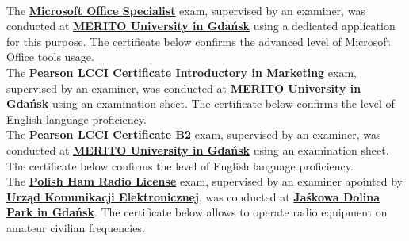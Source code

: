 \begin{rightcolumn}
        \vspace{\itemspace}\\
            {The \href{https://support.microsoft.com/en-us/topic/earn-a-microsoft-office-specialist-mos-certification-0885c944-167c-51ea-1cdc-8f65952bd1b8}{\textbf{Microsoft Office Specialist}} exam, supervised by an examiner, was conducted at \href{https://www.merito.pl/english/gdansk/}{\textbf{MERITO University in Gdańsk}} using a dedicated application for this purpose. The certificate below confirms the advanced level of Microsoft Office tools usage.}
        \vspace{\itemspace}\\
            {The \href{https://drive.google.com/file/d/1vBCEezspA7uQ0AJuSDX23JJqBxelfT__/view}{\textbf{Pearson LCCI Certificate Introductory in Marketing}} exam, supervised by an examiner, was conducted at \href{https://www.merito.pl/english/gdansk/}{\textbf{MERITO University in Gdańsk}} using an examination sheet. The certificate below confirms the level of English language proficiency.}
        \vspace{\itemspace}\\
            {The \href{https://drive.google.com/file/d/13rLS1UrRYQnpc4gBlC56gpBl9o_awkVq/view}{\textbf{Pearson LCCI Certificate B2}} exam, supervised by an examiner, was conducted at \href{https://www.merito.pl/english/gdansk/}{\textbf{MERITO University in Gdańsk}} using an examination sheet. The certificate below confirms the level of English language proficiency.}
        \vspace{\itemspace}\\
            {The \href{https://www.dziennikustaw.gov.pl/D2015000001001.pdf}{\textbf{Polish Ham Radio License}} exam, supervised by an examiner apointed by \href{https://www.uke.gov.pl/}{\textbf{Urząd Komunikacji Elektronicznej}}, was conducted at \href{https://infogdansk.pl/park-jaskowej-doliny/}{\textbf{Jaśkowa Dolina Park in Gdańsk}}. The certificate below allows to operate radio equipment on amateur civilian frequencies.}
    \end{rightcolumn}%
